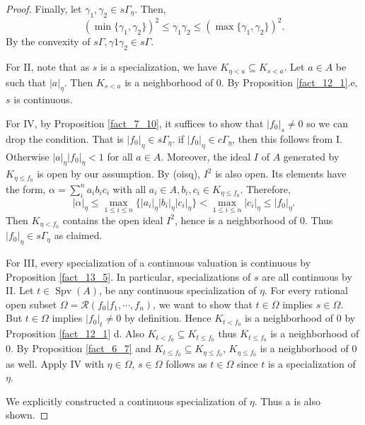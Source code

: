 \documentclass[10pt]{article}
\numberwithin{equation}{section}
\theoremstyle{definition}
\DeclareMathOperator{\Spv}{Spv}
\newcommand{\cR}[0]{\mathcal{R}}
\newcommand{\ab}[1]{\vert #1 \vert}
\newcommand{\cGamma}[0]{c\Gamma}
\begin{document}
\begin{proof}
    Finally, let $\gamma_1,\gamma_2\in s\Gamma_\eta$. Then,
    \begin{equation*}
        (\min\{\gamma_1,\gamma_2\})^2\leq \gamma_1\gamma_2\leq(\max\{\gamma_1,\gamma_2\})^2.
    \end{equation*}
    By the convexity of $s\Gamma,\gamma1\gamma_2\in s\Gamma$.
    \par For II, note that as $s$ is a specialization, we have $K_{\eta<a}\subseteq K_{s<a}$. Let $a\in A$ be such that $\ab{a}_\eta$. Then $K_{s<a}$ is a neighborhood of $0$. By Proposition \ref{fact_12_1}.e, $s$ is continuous.
    \par For IV, by Proposition \ref{fact_7_10}, it suffices to show that $\ab{f_0}_s\not=0$ so we can drop the condition. That is $\ab{f_0}_\eta\in s\Gamma_\eta$. if $\ab{f_0}_\eta\in\cGamma_\eta$, then this follows from I. Otherwise $\ab{a}_\eta\ab{f_0}_\eta<1$ for all $a\in A$.
    Moreover, the ideal $I$ of $A$ generated by $K_{\eta\leq f_0}$ is open by our assumption. By (oisq), $I^2$ is also open. Its elements have the form, $\alpha=\sum_i^n a_ib_ic_i$ with all $a_i\in A, b_i,c_i\in K_{\eta\leq f_0}$. Therefore,
    \begin{equation*}
        \ab{\alpha}_\eta\leq\max_{1\leq i\leq n}\{\ab{a_i}_\eta\ab{b_i}_\eta\ab{c_i}_\eta\}<\max_{1\leq i\leq n}\ab{c_i}_\eta\leq\ab{f_0}_\eta.
    \end{equation*}
    Then $K_{\eta<f_0}$ contains the open ideal $I^2$, hence is a neighborhood of $0$. Thus $\ab{f_0}_\eta\in s\Gamma_\eta$ as claimed.
    \par For III, every specialization of a continuous valuation is continuous by Proposition \ref{fact_13_5}. In particular, specializations of $s$ are all continuous by II.
    Let $t\in \Spv(A)$, be any continuous specialization of $\eta$. For every rational open subset $\Omega = \cR(f_0|f_1,\cdots,f_n)$, we want to show that $t\in\Omega$ implies $s\in\Omega$. But $t\in\Omega$ implies $\ab{f_0}_t\not=0$ by definition.
    Hence $K_{t< f_0}$ is a neighborhood of $0$ by Proposition \ref{fact_12_1} d.
    Also $K_{t< f_0}\subseteq K_{t\leq f_0}$ thus $K_{t\leq f_0}$ is a neighborhood of $0$. By Proposition \ref{fact_6_7} and  $K_{t\leq f_0}\subseteq K_{\eta\leq f_0}$, $K_{\eta\leq f_0}$ is a neighborhood of $0$ as well. Apply IV with $\eta\in\Omega$, $s\in\Omega$ follows as $t\in\Omega$ since $t$ is a specialization of $\eta$.
    \par We explicitly constructed a continuous specialization of $\eta$. Thus a is also shown.
\end{proof}
\end{document}
